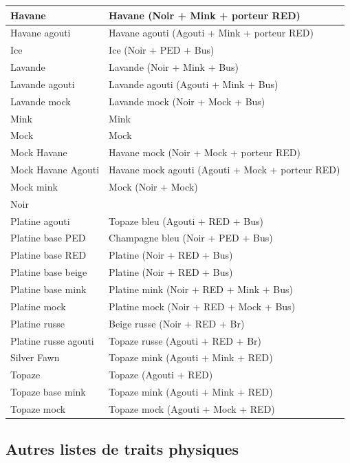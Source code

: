 \documentclass[a4paper,10pt]{article}
\begin{document}
\begin{center}
\begin{tabular}{|l|l|}
Havane& Havane (Noir + Mink + porteur RED)\\\hline
Havane agouti& Havane agouti (Agouti + Mink + porteur RED)\\\hline
Ice&  Ice (Noir + PED + Bus)\\\hline
Lavande& Lavande (Noir + Mink + Bus)\\\hline
Lavande agouti& Lavande agouti (Agouti + Mink + Bus)\\\hline
Lavande mock& Lavande mock (Noir + Mock + Bus)\\\hline
Mink& Mink \\\hline
Mock& Mock \\\hline
Mock Havane& Havane mock (Noir + Mock + porteur RED)\\\hline
Mock Havane Agouti& Havane mock agouti (Agouti + Mock + porteur RED)\\\hline
Mock mink& Mock (Noir + Mock)\\\hline
Noir& \\\hline
Platine agouti& Topaze bleu (Agouti + RED + Bus)\\\hline
Platine base PED& Champagne bleu (Noir + PED + Bus)\\\hline
Platine base RED& Platine (Noir + RED + Bus)\\\hline
Platine base beige& Platine (Noir + RED + Bus)\\\hline
Platine base mink& Platine mink (Noir + RED + Mink + Bus)\\\hline
Platine mock& Platine mock (Noir + RED + Mock + Bus)\\\hline
Platine russe& Beige russe (Noir + RED + Br)\\\hline
Platine russe agouti& Topaze russe (Agouti + RED + Br)\\\hline
Silver Fawn& Topaze mink (Agouti + Mink + RED)\\\hline
Topaze& Topaze (Agouti + RED)\\\hline
Topaze base mink& Topaze mink (Agouti + Mink + RED)\\\hline
Topaze mock& Topaze mock (Agouti + Mock + RED)\\\hline
\end{tabular}\end{center}

\subsection{Autres listes de traits physiques}
\end{document}
